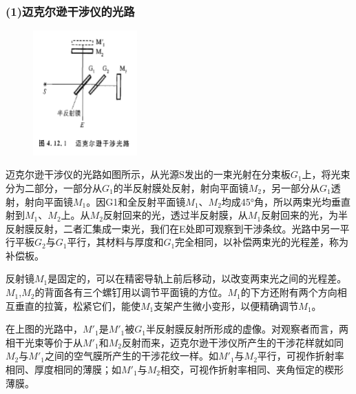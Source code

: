 \documentclass[11pt,a4paper,oneside]{article}
\begin{document}
\subsubsection*{(1)迈克尔逊干涉仪的光路}
\begin{figure}[H]
 \centering
  \includegraphics[width=4cm]{Image/迈克尔逊干涉光路.png}
\end{figure}
迈克尔逊干涉仪的光路如图所示，从光源S发出的一束光射在分束板$G_1$上，将光束分为二部分，一部分从$G_1$的半反射膜处反射，射向平面镜$M_2$，另一部分从$G_1$透射，射向平面镜$M_1$。因G1和全反射平面镜$M_1$、$M_2$均成45°角，所以两束光均垂直射到$M_1$、$M_2$上。从$M_2$反射回来的光，透过半反射膜，从$M_1$反射回来的光，为半反射膜反射，二者汇集成一束光，我们在E处即可观察到干涉条纹。光路中另一平行平板$G_2$与$G_1$平行，其材料与厚度和$G_1$完全相同，以补偿两束光的光程差，称为补偿板。

反射镜$M_1$是固定的，可以在精密导轨上前后移动，以改变两束光之间的光程差。$M_1$,$M_2$的背面各有三个螺钉用以调节平面镜的方位。$M_1$的下方还附有两个方向相互垂直的拉簧，松紧它们，能使$M_1$支架产生微小变形，以便精确调节$M_1$。

在上图的光路中，$M'_1$是$M'_1$被$G_1$半反射膜反射所形成的虚像。对观察者而言，两相干光束等价于从$M'_1$和$M_2$反射而来，迈克尔逊干涉仪所产生的干涉花样就如同$M_2$与$M'_1$之间的空气膜所产生的干涉花纹一样。如$M'_1$与$M_2$平行，可视作折射率相同、厚度相同的薄膜；如$M'_1$与$M_2$相交，可视作折射率相同、夹角恒定的楔形薄膜。
\end{document}
